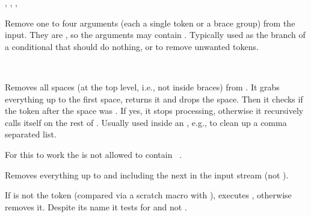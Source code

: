 \documentclass{l3in2edoc}
\begin{document}
\begin{function}[]
  {
    \@gobble,
    \@gobbletwo,
    \@gobblethree,
    \@gobblefour
  }
  \begin{syntax}
     
  \end{syntax}
  Remove one to four arguments (each a single token or a brace
  group) from the input. They are , so the arguments may
  contain . Typically used as the branch of a conditional that
  should do nothing, or to remove unwanted tokens.
\end{function}



\begin{function}[]
  {
    \zap@space
  }
  \begin{syntax}
      \verb*/ /
  \end{syntax}
  Removes all spaces (at the top level, i.e., not inside braces) from
  . It grabs everything up to the first space, returns
  it and drops the space. Then it checks if the token after the space
  was . If yes, it stops processing, otherwise it
  recursively calls itself on the rest of . Usually
  used inside an , e.g., to clean up a comma separated list.

  For this to work the  is not allowed to contain
  \verb*/ /.
\end{function}



\begin{function}[EXP]
  {
    \remove@to@nnil
  }
  \begin{syntax}
      
  \end{syntax}
  Removes everything up to and including the next  in the input
  stream (not ).
\end{function}


\begin{function}[]
  {
    \ifnot@nil
  }
  \begin{syntax}
      
  \end{syntax}
  If  is not the token  (compared via a
  scratch macro with ), executes , otherwise
  removes it. Despite its name it tests for  and not
  .
\end{function}
\end{document}
